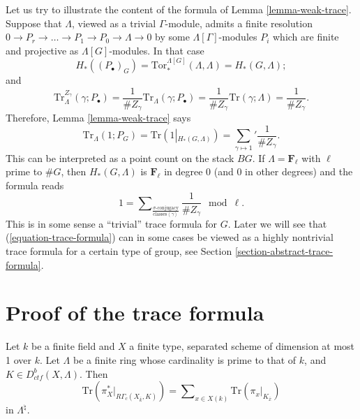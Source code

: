 \begin{remark}
\label{remark-content-trivial-trace}
Let us try to illustrate the content of the formula of
Lemma \ref{lemma-weak-trace}.
Suppose that $\Lambda$, viewed as a trivial $\Gamma$-module, admits a finite
resolution
$
0\to P_r\to \ldots \to P_1 \to P_0\to \Lambda\to 0
$
by some $\Lambda[\Gamma]$-modules $P_i$ which are finite and projective as
$\Lambda[G]$-modules. In that case
$$
H_*\left(\left(P_\bullet\right)_G\right) =
\text{Tor}_*^{\Lambda[G]}\left(\Lambda, \Lambda\right) = H_*(G, \Lambda) ;
$$
and
$$
\text{Tr}_\Lambda^{Z_\gamma}\left(\gamma; P_\bullet\right) =\frac{1}{\#
Z_\gamma}\text{Tr}_\Lambda(\gamma; P_\bullet)=\frac{1}{\#
Z_\gamma}\text{Tr}(\gamma;\Lambda) = \frac{1}{\# Z_\gamma}.
$$
Therefore, Lemma \ref{lemma-weak-trace} says
$$
\text{Tr}_\Lambda (1 ; P_G)
= \text{Tr}\left(1\left|_{H_*(G, \Lambda)}\right.\right)
= {\sum_{\gamma\mapsto1}}'\frac{1}{\# Z_\gamma}.
$$
This can be interpreted as a point count on the stack $BG$. If
$\Lambda = \mathbf{F}_\ell$ with $\ell$ prime to $\#G$, then
$H_*(G, \Lambda)$ is $\mathbf{F}_\ell$ in degree 0 (and $0$ in
other degrees) and the formula reads
$$
1 =
\sum\nolimits_{
\frac{\sigma\text{-conjugacy}}{\text{classes}\left<\gamma\right>}
}
\frac{1}{\# Z_\gamma} \mod{\ell}.
$$
This is in some sense a ``trivial'' trace formula for $G$.
Later we will see that (\ref{equation-trace-formula}) can in
some cases be viewed as a highly nontrivial trace formula for a
certain type of group, see
Section \ref{section-abstract-trace-formula}.
\end{remark}





\section{Proof of the trace formula}
\label{section-proof-trace-formula}

\begin{theorem}
\label{theorem-trace-formula-again}
Let $k$ be a finite field and $X$ a finite type, separated scheme of dimension
at most 1 over $k$. Let $\Lambda$ be a finite ring whose cardinality is prime
to that of $k$, and $K\in D_{ctf}^b(X, \Lambda)$. Then
\begin{equation}
\label{equation-trace-formula-again}
\text{Tr} \left(\pi_X^*\big|_{R\Gamma_c(X_{\bar k}, K)}\right)
=
\sum\nolimits_{x\in X(k)}
\text{Tr}\left(\pi_x\big|_{K_{\bar x}}\right)
\end{equation}
in $\Lambda^{\natural}$.
\end{theorem}

